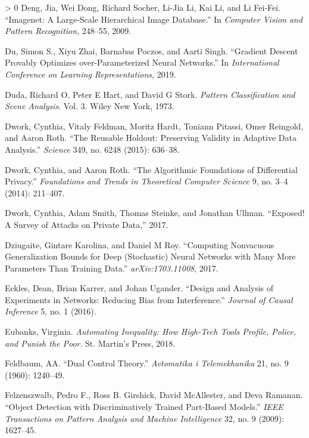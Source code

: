\documentclass{tufte-book}
\newlength{\cslhangindent}
\newenvironment{CSLReferences}[3] %
 {%
  \setlength{\parindent}{0pt}
  \ifodd #1 \everypar{\setlength{\hangindent}{\cslhangindent}}\ignorespaces\fi
  \ifnum #2 > 0
  \setlength{\parskip}{#3\baselineskip}
  \fi
 }%
 {
 }
\begin{document}
\begin{CSLReferences}{1}{0}
\leavevmode\hypertarget{ref-deng2009imagenet}{}%
Deng, Jia, Wei Dong, Richard Socher, Li-Jia Li, Kai Li, and Li Fei-Fei.
{``Imagenet: A Large-Scale Hierarchical Image Database.''} In
\emph{Computer Vision and Pattern Recognition}, 248--55, 2009.

\leavevmode\hypertarget{ref-Du18gradient}{}%
Du, Simon S., Xiyu Zhai, Barnabas Poczos, and Aarti Singh. {``Gradient
Descent Provably Optimizes over-Parameterized Neural Networks.''} In
\emph{International Conference on Learning Representations}, 2019.

\leavevmode\hypertarget{ref-duda1973pattern}{}%
Duda, Richard O, Peter E Hart, and David G Stork. \emph{Pattern
Classification and Scene Analysis}. Vol. 3. Wiley New York, 1973.

\leavevmode\hypertarget{ref-dwork2015reusable}{}%
Dwork, Cynthia, Vitaly Feldman, Moritz Hardt, Toniann Pitassi, Omer
Reingold, and Aaron Roth. {``The Reusable Holdout: Preserving Validity
in Adaptive Data Analysis.''} \emph{Science} 349, no. 6248 (2015):
636--38.

\leavevmode\hypertarget{ref-dwork2014algorithmic}{}%
Dwork, Cynthia, and Aaron Roth. {``The Algorithmic Foundations of
Differential Privacy.''} \emph{Foundations and Trends in Theoretical
Computer Science} 9, no. 3--4 (2014): 211--407.

\leavevmode\hypertarget{ref-dwork2017exposed}{}%
Dwork, Cynthia, Adam Smith, Thomas Steinke, and Jonathan Ullman.
{``Exposed! A Survey of Attacks on Private Data,''} 2017.

\leavevmode\hypertarget{ref-dziugaite2017computing}{}%
Dziugaite, Gintare Karolina, and Daniel M Roy. {``Computing Nonvacuous
Generalization Bounds for Deep (Stochastic) Neural Networks with Many
More Parameters Than Training Data.''} \emph{arXiv:1703.11008}, 2017.

\leavevmode\hypertarget{ref-eckles2016design}{}%
Eckles, Dean, Brian Karrer, and Johan Ugander. {``Design and Analysis of
Experiments in Networks: Reducing Bias from Interference.''}
\emph{Journal of Causal Inference} 5, no. 1 (2016).

\leavevmode\hypertarget{ref-eubanks2018automating}{}%
Eubanks, Virginia. \emph{Automating Inequality: How High-Tech Tools
Profile, Police, and Punish the Poor}. St. Martin's Press, 2018.

\leavevmode\hypertarget{ref-feldbaum1960dual}{}%
Feldbaum, AA. {``Dual Control Theory.''} \emph{Avtomatika i
Telemekhanika} 21, no. 9 (1960): 1240--49.

\leavevmode\hypertarget{ref-felzenszwalb2009object}{}%
Felzenszwalb, Pedro F., Ross B. Girshick, David McAllester, and Deva
Ramanan. {``Object Detection with Discriminatively Trained Part-Based
Models.''} \emph{{IEEE} Transactions on Pattern Analysis and Machine
Intelligence} 32, no. 9 (2009): 1627--45.


\end{CSLReferences}
\end{document}
